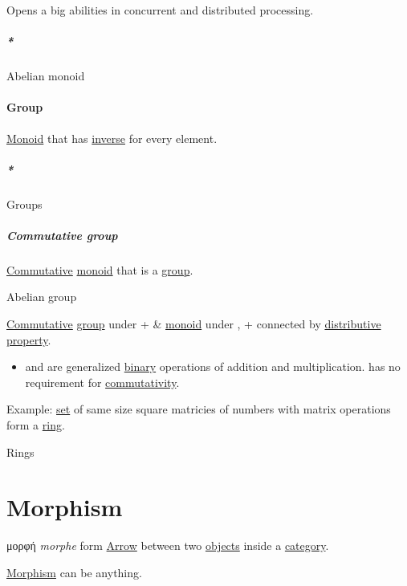 \documentclass[a4paper,14pt,oneside]{book}
\begin{document}
Opens a big abilities in concurrent and distributed processing.

\subparagraph{\emph{*}}
\label{sec:orga46c229}

\label{org58c6815}Abelian monoid

\paragraph{\label{orgaea08fa}Group}
\label{sec:orgcd09887}
\hyperref[org9e1ff1f]{Monoid} that has \hyperref[org5ad120e]{inverse} for every element.

\subparagraph{\emph{*}}
\label{sec:org78c0db9}

\label{orgf3ac066}Groups

\subparagraph{\label{orgf2cf93f}Commutative group}
\label{sec:org4eb743a}
\hyperref[org5aa111e]{Commutative} \hyperref[org9e1ff1f]{monoid} that is a \hyperref[orgaea08fa]{group}.

\subsubparagraph{\emph{*}}
\label{sec:orgdd8e3f5}

\label{orge9d1433}Abelian group

\label{sec:org7e52817}
\hyperref[org5aa111e]{Commutative} \hyperref[orgaea08fa]{group} under + \& \hyperref[org9e1ff1f]{monoid} under \texttimes{}, + \texttimes{} connected by \hyperref[orgd7e7a7b]{distributive} \hyperref[org81d0df4]{property}.

\begin{itemize}
\item and \texttimes{} are generalized \hyperref[org1e356fa]{binary} operations of addition and multiplication. \texttimes{} has no requirement for \hyperref[org4500176]{commutativity}.
\end{itemize}

Example: \hyperref[org28abdc9]{set} of same size square matricies of numbers with matrix operations form a \hyperref[orgcd09e33]{ring}.

\subsubsubparagraph{\emph{*}}
\label{sec:org4cbefa7}

\label{orgfce8ba5}Rings

\section{\label{orgcfa41a6}Morphism}
\label{sec:org780525c}
μορφή \emph{morphe} form
\hyperref[org0b51b24]{Arrow} between two \hyperref[org88e24d2]{objects} inside a \hyperref[org82baa03]{category}.

\hyperref[orgcfa41a6]{Morphism} can be anything.
\end{document}
